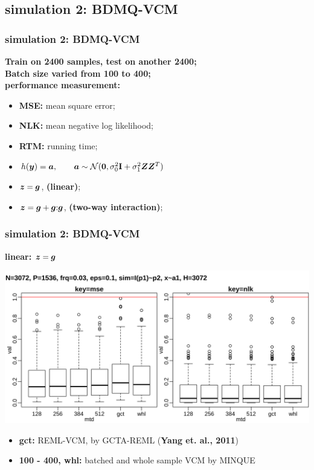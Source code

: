 \documentclass{beamer}
\begin{document}
\subsection{simulation 2: BDMQ-VCM}
\begin{frame}\frametitle{simulation 2: BDMQ-VCM}
  \textbf{Train on 2400 samples, test on another 2400;} \\
  \textbf{Batch size varied from 100 to 400;} \\
  {\color{blue}\textbf{performance measurement:}}
  \begin{itemize}
  \item \textbf{MSE:} mean square error;
  \item \textbf{NLK:} mean negative log likelihood;
  \item \textbf{RTM:} running time;
  \end{itemize}
  \begin{itemize}
  \item $h({\bm{y}})={\bm{a}}, \qquad {\bm{a}} \sim \mathcal{N}(\bm{0}, \sigma_0^2\textbf{I} + \sigma_1^2{\bm{Z}}{\bm{Z}}^T)$
  \item ${\bm{z}} = {\bm{g}}$, \textbf{(linear)};
  \item ${\bm{z}} = {\bm{g}} + {\bm{g}}\mathbf{:}{\bm{g}}$, \textbf{(two-way interaction)};
  \end{itemize}
\end{frame}
\begin{frame}\frametitle{simulation 2: BDMQ-VCM}
  \textbf{linear: ${\bm{z}} = {\bm{g}}$} \\
  \centerline{\includegraphics[width=.9\linewidth]{img/ukb_bat_p01}}
  \textbf{\color{blue}{inner plot: strategies, from left to right:}}
  \begin{itemize}
  \item \textbf{gct:} REML-VCM, by GCTA-REML (\textbf{Yang et. al., 2011})
  \item \textbf{100 - 400, whl:} batched and whole sample VCM by MINQUE
  \end{itemize}
\end{frame}
\end{document}

